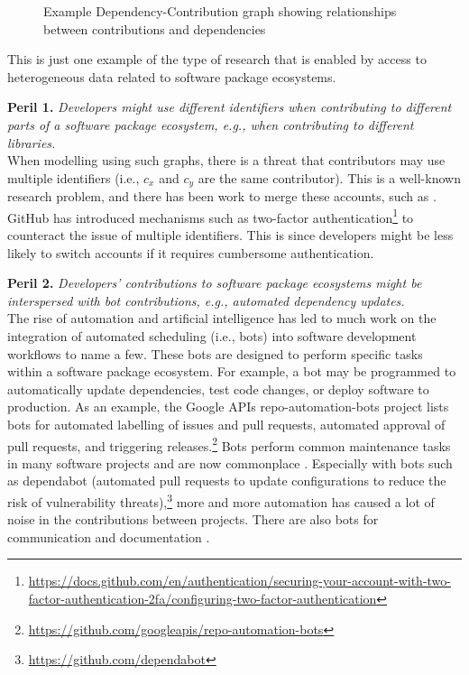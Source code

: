 \begin{figure}[t]
    \centering
    \begin{tikzpicture}[
        roundnode/.style={circle, fill=black, minimum size=5mm},
        squarenode/.style={fill=black, text=red, minimum size=5mm},
    ]
    \end{tikzpicture}
\caption{Example Dependency-Contribution graph showing relationships between contributions and dependencies}
 \label{fig:dc-graph}
\end{figure}

This is just one example of the type of research that is enabled by access to heterogeneous data related to software package ecosystems.

\smallskip\noindent\textbf{Peril 1.}\textit{
 Developers might use different identifiers when contributing to different parts of a software package ecosystem, e.g., when contributing to different libraries.}\\
 
When modelling using such graphs, there is a threat that contributors may use multiple identifiers (i.e., $c_x$ and $c_y$ are the same contributor).
This is a well-known research problem, and there has been work to merge these accounts, such as \cite{wiese2016mailing}.
GitHub has introduced mechanisms such as two-factor authentication\footnote{\url{https://docs.github.com/en/authentication/securing-your-account-with-two-factor-authentication-2fa/configuring-two-factor-authentication}} to counteract the issue of multiple identifiers.
This is since developers might be less likely to switch accounts if it requires cumbersome authentication.


\smallskip\noindent\textbf{Peril 2.}\textit{
Developers' contributions to software package ecosystems might be interspersed with bot contributions, e.g., automated dependency updates.}\\

The rise of automation and artificial intelligence has led to much work on the integration of automated scheduling (i.e., bots) into software development workflows \cite{Storey2016, Farooq2016, Wessel2018, Erlenhov2019, bot_modify_wf} to name a few. These bots are designed to perform specific tasks within a software package ecosystem. For example, a bot may be programmed to automatically update dependencies, test code changes, or deploy software to production. As an example, the Google APIs repo-automation-bots project lists bots for automated labelling of issues and pull requests, automated approval of pull requests, and triggering releases.\footnote{\url{https://github.com/googleapis/repo-automation-bots}}
Bots perform common maintenance tasks in many software projects and are now commonplace \cite{Beschastnikh2017, Urli2018,BIMAN,bot_or_not}.
Especially with bots such as dependabot (automated pull requests to update configurations to reduce the risk of vulnerability threats),\footnote{\url{https://github.com/dependabot}} more and more automation has caused a lot of noise in the contributions between projects.
There are also bots for communication and documentation \cite{Urli2018, Lin2016, Lebeuf2017a}.

